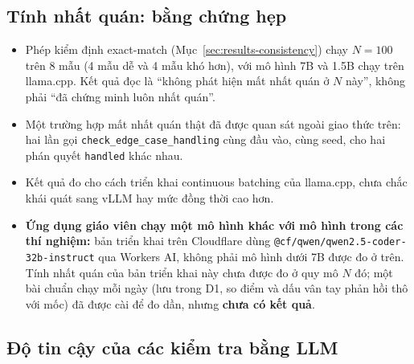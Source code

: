 \documentclass[a4paper,12pt]{report}
\begin{document}
\subsection{Tính nhất quán: bằng chứng hẹp}

\begin{itemize}
  \item Phép kiểm định exact-match (Mục~\ref{sec:results-consistency}) chạy
    $N=100$ trên 8 mẫu (4 mẫu dễ và 4 mẫu khó hơn), với mô hình 7B và 1.5B
    chạy trên llama.cpp. Kết quả đọc là ``không phát hiện mất nhất quán ở
    $N$ này'', không phải ``đã chứng minh luôn nhất quán''.
  \item Một trường hợp mất nhất quán thật đã được quan sát ngoài giao thức
    trên: hai lần gọi \texttt{check\_edge\_case\_handling} cùng đầu vào, cùng
    seed, cho hai phán quyết \texttt{handled} khác nhau.
  \item Kết quả đo cho cách triển khai continuous batching của llama.cpp,
    chưa chắc khái quát sang vLLM hay mức đồng thời cao hơn.
  \item \textbf{Ứng dụng giáo viên chạy một mô hình khác với mô hình trong các
    thí nghiệm:} bản triển khai trên Cloudflare dùng
    \texttt{@cf/qwen/qwen2.5-coder-32b-instruct} qua Workers AI, không phải mô
    hình dưới 7B được đo ở trên. Tính nhất quán của bản triển khai này chưa
    được đo ở quy mô $N$ đó; một bài chuẩn chạy mỗi ngày (lưu trong D1, so
    điểm và dấu vân tay phản hồi thô với mốc) đã được cài để đo dần, nhưng
    \textbf{chưa có kết quả}.
\end{itemize}

\subsection{Độ tin cậy của các kiểm tra bằng LLM}
\end{document}
